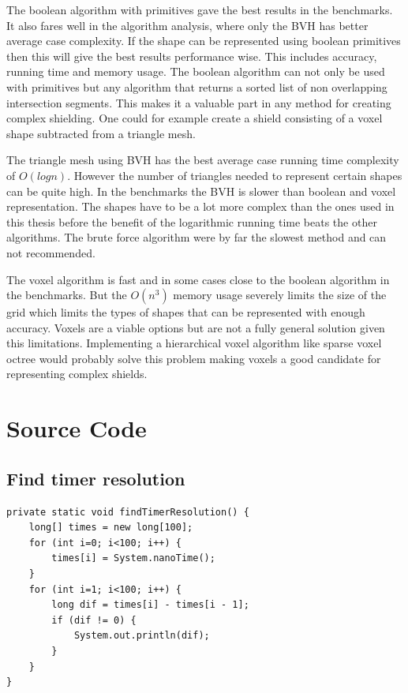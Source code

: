 \documentclass[11pt,twoside,a4paper]{report}
\begin{document}
The boolean algorithm with primitives gave the best results in the benchmarks. It also fares well in the algorithm analysis, where only the BVH has better average case complexity. If the shape can be represented using boolean primitives then this will give the best results performance wise. This includes accuracy, running time and memory usage. The boolean algorithm can not only be used with primitives but any algorithm that returns a sorted list of non overlapping intersection segments. This makes it a valuable part in any method for creating complex shielding. One could for example create a shield consisting of a voxel shape subtracted from a triangle mesh.

The triangle mesh using BVH has the best average case running time complexity of $O(log n)$. However the number of triangles needed to represent certain shapes can be quite high. In the benchmarks the BVH is slower than boolean and voxel representation. The shapes have to be a lot more complex than the ones used in this thesis before the benefit of the logarithmic running time beats the other algorithms. The brute force algorithm were by far the slowest method and can not recommended. 

The voxel algorithm is fast and in some cases close to the boolean algorithm in the benchmarks. But the $O(n^3)$ memory usage severely limits the size of the grid which limits the types of shapes that can be represented with enough accuracy. Voxels are a viable options but are not a fully general solution given this limitations. Implementing a hierarchical voxel algorithm like sparse voxel octree would probably solve this problem making voxels a good candidate for representing complex shields.




\listoffigures
\listoftables
\appendix
\chapter{Source Code}

\section{Find timer resolution}
\label{source:timer_timer_resolution}
\begin{lstlisting}
private static void findTimerResolution() {
    long[] times = new long[100];
    for (int i=0; i<100; i++) {
        times[i] = System.nanoTime();
    }
    for (int i=1; i<100; i++) {
        long dif = times[i] - times[i - 1];
        if (dif != 0) {
            System.out.println(dif);
        }
    }
}
\end{lstlisting}
\end{document}
